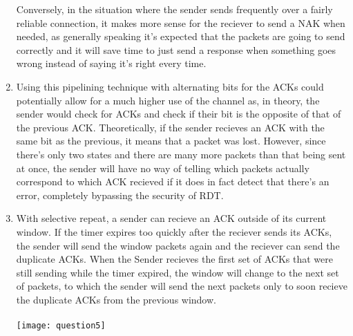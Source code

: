 \documentclass[12pt]{article}
\begin{document}
\begin{enumerate}
	Conversely, in the situation where the sender sends frequently over a fairly reliable connection, it makes more sense for the reciever to send a NAK when needed, as generally speaking it's expected that the packets are going to send correctly and it will save time to just send a response when something goes wrong instead of saying it's right every time.

	\item Using this pipelining technique with alternating bits for the ACKs could potentially allow for a much higher use of the channel as, in theory, the sender would check for ACKs and check if their bit is the opposite of that of the previous ACK. Theoretically, if the sender recieves an ACK with the same bit as the previous, it means that a packet was lost. However, since there's only two states and there are many more packets than that being sent at once, the sender will have no way of telling which packets actually correspond to which ACK recieved if it does in fact detect that there's an error, completely bypassing the security of RDT.

	\item With selective repeat, a sender can recieve an ACK outside of its current window. If the timer expires too quickly after the reciever sends its ACKs, the sender will send the window packets again and the reciever can send the duplicate ACKs. When the Sender recieves the first set of ACKs that were still sending while the timer expired, the window will change to the next set of packets, to which the sender will send the next packets only to soon recieve the duplicate ACKs from the previous window.\\
	\\
	\texttt{[image: question5]}\\


\end{enumerate}
\end{document}

